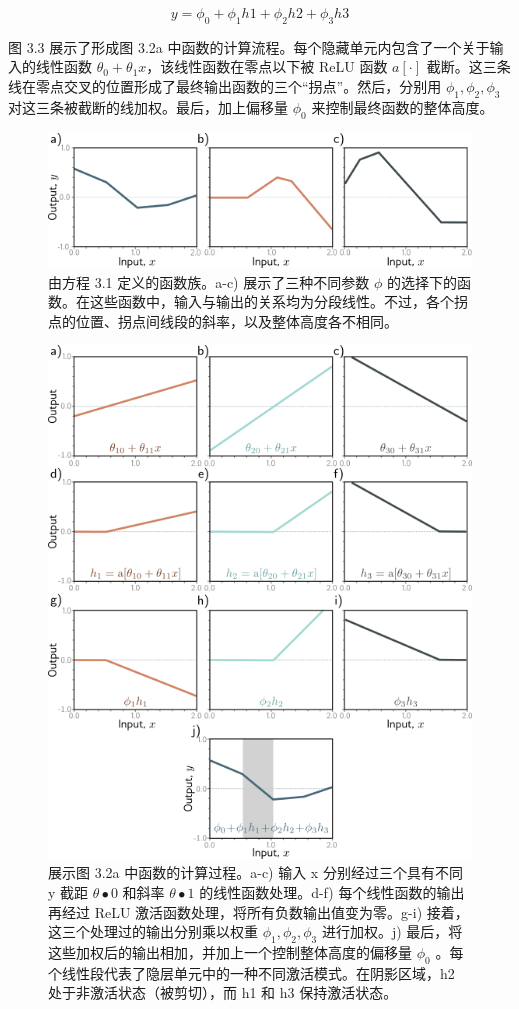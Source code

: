 \[
y = \phi_0 + \phi_1h1 + \phi_2h2 + \phi_3h3 \tag{3.4}
\]

图 3.3 展示了形成图 3.2a 中函数的计算流程。每个隐藏单元内包含了一个关于输入的线性函数 \(\theta_0 + \theta_1x\)，该线性函数在零点以下被 ReLU 函数 \(a[\cdot]\) 截断。这三条线在零点交叉的位置形成了最终输出函数的三个“拐点”。然后，分别用 \(\phi_1, \phi_2, \phi_3\) 对这三条被截断的线加权。最后，加上偏移量 \(\phi_0\) 来控制最终函数的整体高度。

\begin{figure}[ht!]
	\centering
	\includegraphics[width=0.7\linewidth]{png/chapter3/ShallowFunctions.png}
\caption{由方程 3.1 定义的函数族。a-c) 展示了三种不同参数 \(\phi\) 的选择下的函数。在这些函数中，输入与输出的关系均为分段线性。不过，各个拐点的位置、拐点间线段的斜率，以及整体高度各不相同。}
\end{figure}

\begin{figure}[ht!]
	\centering
	\includegraphics[width=0.7\linewidth]{png/chapter3/ShallowBuildUp.png}
\caption{展示图 3.2a 中函数的计算过程。a-c) 输入 x 分别经过三个具有不同 y 截距 \(\theta•0\) 和斜率 \(\theta•1\) 的线性函数处理。d-f) 每个线性函数的输出再经过 ReLU 激活函数处理，将所有负数输出值变为零。g-i) 接着，这三个处理过的输出分别乘以权重 \(\phi_1 , \phi_2 , \phi_3\) 进行加权。j) 最后，将这些加权后的输出相加，并加上一个控制整体高度的偏移量 \(\phi_0\) 。每个线性段代表了隐层单元中的一种不同激活模式。在阴影区域，h2 处于非激活状态（被剪切），而 h1 和 h3 保持激活状态。}
\end{figure}

